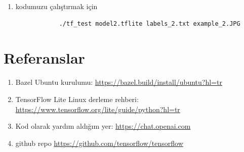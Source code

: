 \documentclass[12pt,a4paper]{article}
\begin{document}
\begin{enumerate}
\begin{enumerate}
\begin{verbatim}
			
		\end{verbatim}
		
		\pagebreak
		\item kodumuzu çalıştırmak için
		\begin{verbatim}
			./tf_test model2.tflite labels_2.txt example_2.JPG 
		\end{verbatim}
		
	\end{enumerate}

	
	\newpage 
	
	\section*{Referanslar} 
	
	\begin{enumerate}
		\item Bazel Ubuntu kurulumu: \url{https://bazel.build/install/ubuntu?hl=tr}
		\item TensorFlow Lite Linux derleme rehberi: \url{https://www.tensorflow.org/lite/guide/python?hl=tr}
		\item Kod olarak yardım aldığım yer:
		\url{https://chat.openai.com}
		\item github repo
		\url {https://github.com/tensorflow/tensorflow}
	\end{enumerate}
	
		
		
		
	\end{enumerate}
\end{document}
